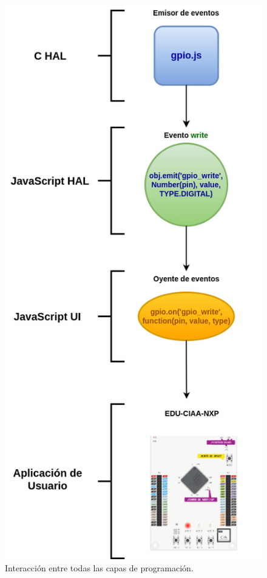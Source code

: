 \begin{figure}[ht]
	\centering
	\includegraphics[scale=.40]{./Figures/AplicacionUsuarioLeds.png}
	\caption{Interacción entre todas las capas de programación.}
	\label{fig:AplicacionUsuarioLeds}
\end{figure}

